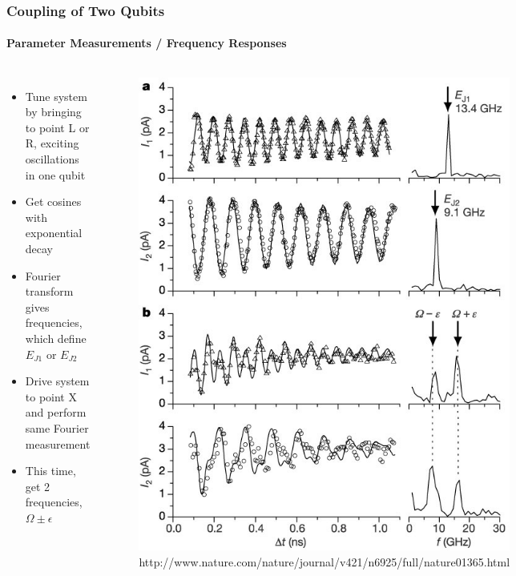 \documentclass{beamer}
\begin{document}

\begin{frame}
    \frametitle{Coupling of Two Qubits}
    \framesubtitle{Parameter Measurements / Frequency Responses}
    \begin{columns}
            \fontsize{6}{10}\selectfont
            \begin{itemize}
                \item Tune system by bringing to point L or R, exciting oscillations in one qubit
                \item Get cosines with exponential decay
                \item Fourier transform gives frequencies, which define $E_{J1}$ or $E_{J2}$
                \item Drive system to point X and perform same Fourier measurement
                \item This time, get 2 frequencies, $\Omega \pm \epsilon$
            \end{itemize}
            \begin{figure}[ht!]
                \centering
                \includegraphics[height=0.6\textheight]{img/probe-current-osc.jpg}
                \caption{http://www.nature.com/nature/journal/v421/n6925/full/nature01365.html}
            \end{figure}
    \end{columns}
\end{frame}
\end{document}
